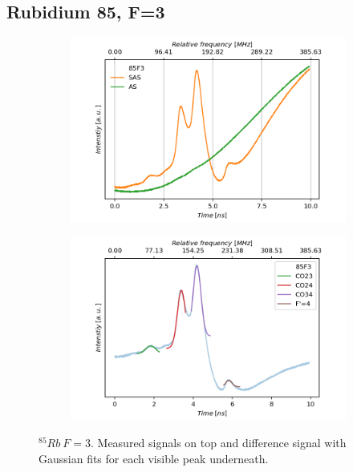 \documentclass[]{article}
\begin{document}
\subsection{Rubidium 85, F=3}
\begin{figure}[H]
\centering
\begin{subfigure}{.7\textwidth}
\includegraphics[width=\linewidth]{Plots/85F3_Both.png}
\end{subfigure}

\begin{subfigure}[c]{.7\textwidth}
\includegraphics[width=\linewidth]{Plots/85F3_Diff.png}
\end{subfigure}
\caption{$^{85}Rb\ F=3 $. Measured signals on top and difference signal with Gaussian fits for each visible peak underneath.}
\label{fig: 85F3}
\end{figure}
\end{document}
